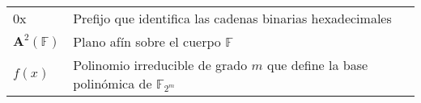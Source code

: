 
\renewcommand{\arraystretch}{1.5}

\begin{longtable}{l p{13.7cm}}
0x & Prefijo que identifica las cadenas binarias hexadecimales\\
$\textbf{A}^{2}(\mathbb{F})$ & Plano afín sobre el cuerpo $\mathbb{F}$\\
$f(x)$ & Polinomio irreducible de grado $m$ que define la base polinómica de $\mathbb{F}_{2^{m}}$\\
\end{longtable}





